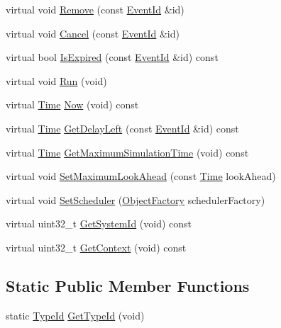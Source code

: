 \begin{DoxyCompactItemize}
\item 
virtual void \hyperlink{classns3_1_1DistributedSimulatorImpl_a4dfb40c258496656f8cfd324d124c825}{Remove} (const \hyperlink{classns3_1_1EventId}{Event\+Id} \&id)
\item 
virtual void \hyperlink{classns3_1_1DistributedSimulatorImpl_a01dbbe5f49399a58cde9959cebeee3ac}{Cancel} (const \hyperlink{classns3_1_1EventId}{Event\+Id} \&id)
\item 
virtual bool \hyperlink{classns3_1_1DistributedSimulatorImpl_a2f1a2977c37fa67851180aefe3e40830}{Is\+Expired} (const \hyperlink{classns3_1_1EventId}{Event\+Id} \&id) const 
\item 
virtual void \hyperlink{classns3_1_1DistributedSimulatorImpl_a5a2cd016631eac7f93dba3b08ab0e0dd}{Run} (void)
\item 
virtual \hyperlink{classns3_1_1Time}{Time} \hyperlink{classns3_1_1DistributedSimulatorImpl_aa9b73613048f2eaa9ab848b71c43bd2d}{Now} (void) const 
\item 
virtual \hyperlink{classns3_1_1Time}{Time} \hyperlink{classns3_1_1DistributedSimulatorImpl_a830e4d9a0d37e7711486b1b494f2ea80}{Get\+Delay\+Left} (const \hyperlink{classns3_1_1EventId}{Event\+Id} \&id) const 
\item 
virtual \hyperlink{classns3_1_1Time}{Time} \hyperlink{classns3_1_1DistributedSimulatorImpl_a09879f4ab9e765716a96b40900be4480}{Get\+Maximum\+Simulation\+Time} (void) const 
\item 
virtual void \hyperlink{classns3_1_1DistributedSimulatorImpl_adfe777ad071af4ff011f75f38b444b0b}{Set\+Maximum\+Look\+Ahead} (const \hyperlink{classns3_1_1Time}{Time} look\+Ahead)
\item 
virtual void \hyperlink{classns3_1_1DistributedSimulatorImpl_ab30dedff30255b2a6ccd71e58010ac6e}{Set\+Scheduler} (\hyperlink{classns3_1_1ObjectFactory}{Object\+Factory} scheduler\+Factory)
\item 
virtual uint32\+\_\+t \hyperlink{classns3_1_1DistributedSimulatorImpl_a2a3b19743b32474c365f620cdd15e48e}{Get\+System\+Id} (void) const 
\item 
virtual uint32\+\_\+t \hyperlink{classns3_1_1DistributedSimulatorImpl_a8d7ed9e4a8994de9473d1b9ad2d39418}{Get\+Context} (void) const 
\end{DoxyCompactItemize}
\subsection*{Static Public Member Functions}
\begin{DoxyCompactItemize}
\item 
static \hyperlink{classns3_1_1TypeId}{Type\+Id} \hyperlink{classns3_1_1DistributedSimulatorImpl_ad6e7fa50059ad6517153e4de7ef84182}{Get\+Type\+Id} (void)
\end{DoxyCompactItemize}
